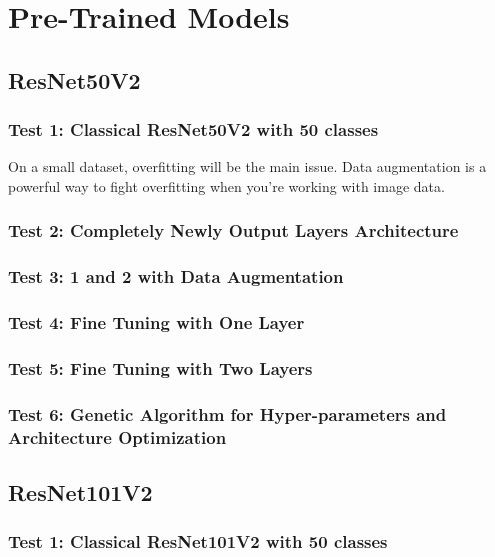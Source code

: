 \section{Pre-Trained Models}

\subsection{ResNet50V2}

\subsubsection{Test 1: Classical ResNet50V2 with 50 classes}
On a small dataset, overfitting will be the main issue. Data augmentation is a powerful way to fight overfitting when you’re working with image data.

\subsubsection{Test 2: Completely Newly Output Layers Architecture}

\subsubsection{Test 3: 1 and 2 with Data Augmentation}

\subsubsection{Test 4: Fine Tuning with One Layer}

\subsubsection{Test 5: Fine Tuning with Two Layers}

\subsubsection{Test 6: Genetic Algorithm for Hyper-parameters and Architecture Optimization}







\subsection{ResNet101V2}

\subsubsection{Test 1: Classical ResNet101V2 with 50 classes}

